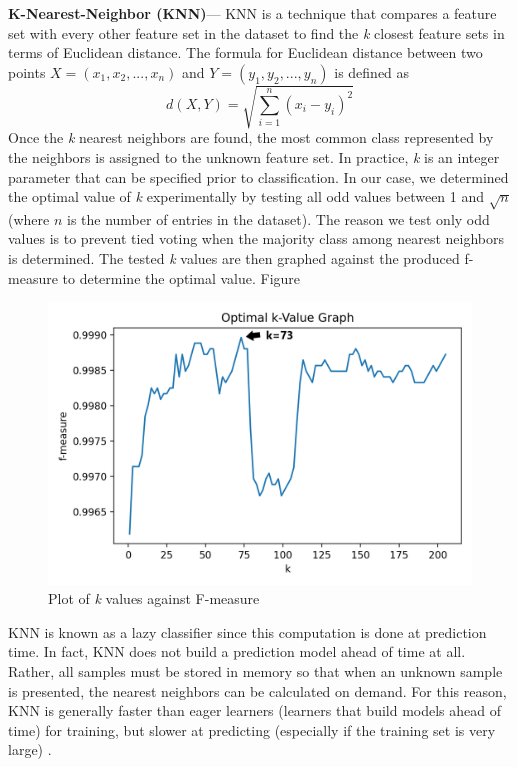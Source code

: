 \documentclass[letterpaper, 10 pt, conference]{ieeeconf}  %
\begin{document}
\textbf{K-Nearest-Neighbor (KNN)}--- KNN is a technique that compares a feature set with every other feature set in the dataset to find the \textit{k} closest feature sets in terms of Euclidean distance. The formula for Euclidean distance between two points $X=(x_1, x_2,...,x_n)$ and $Y=(y_1, y_2,...,y_n)$ is defined as
\begin{equation}
d(X, Y)=\sqrt{\sum_{i=1}^{n} (x_i - y_i)^2}
\end{equation}
Once the \textit{k} nearest neighbors are found, the most common class represented by the neighbors is assigned to the unknown feature set. In practice, \textit{k} is an integer parameter that can be specified prior to classification. In our case, we determined the optimal value of \textit{k} experimentally by testing all odd values between 1 and $\sqrt{n}$ (where $n$ is the number of entries in the dataset). The reason we test only odd values is to prevent tied voting when the majority class among nearest neighbors is determined. The tested \textit{k} values are then graphed against the produced f-measure to determine the optimal value. Figure

\begin{figure}
    \centering
    \includegraphics[scale=0.25]{k_vals_plot.png}
    \caption{Plot of \textit{k} values against F-measure}
    \label{fig:my_label}
\end{figure}

KNN is known as a lazy classifier since this computation is done at prediction time. In fact, KNN does not build a prediction model ahead of time at all. Rather, all samples must be stored in memory so that when an unknown sample is presented, the nearest neighbors can be calculated on demand. For this reason, KNN is generally faster than eager learners (learners that build models ahead of time) for training, but slower at predicting (especially if the training set is very large) \cite{phyu2009survey}. 
\end{document}
